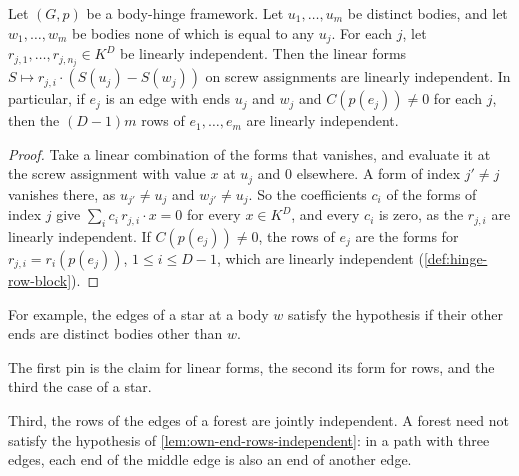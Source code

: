 \begin{lemma}
  \label{lem:own-end-rows-independent}
  \leanok
  Let $(G,p)$ be a body-hinge framework. Let $u_1, \dots, u_m$ be
  distinct bodies, and let $w_1, \dots, w_m$ be bodies none of which is
  equal to any $u_j$. For each $j$, let
  $r_{j,1}, \dots, r_{j,n_j} \in K^D$ be linearly independent. Then the
  linear forms $S \mapsto r_{j,i} \cdot (S(u_j) - S(w_j))$ on screw
  assignments are linearly independent. In particular, if $e_j$ is an
  edge with ends $u_j$ and $w_j$ and $C(p(e_j)) \neq 0$ for each $j$,
  then the $(D-1)m$ rows of $e_1, \dots, e_m$ are linearly independent.
\end{lemma}
\begin{proof}
  \leanok
  Take a linear combination of the forms that vanishes, and evaluate it
  at the screw assignment with value $x$ at $u_j$ and $0$ elsewhere. A
  form of index $j' \neq j$ vanishes there, as $u_{j'} \neq u_j$ and
  $w_{j'} \neq u_j$. So the coefficients $c_i$ of the forms of index $j$
  give $\sum_i c_i\, r_{j,i} \cdot x = 0$ for every $x \in K^D$, and
  every $c_i$ is zero, as the $r_{j,i}$ are linearly independent. If
  $C(p(e_j)) \neq 0$, the rows of $e_j$ are the forms for
  $r_{j,i} = r_i(p(e_j))$, $1 \le i \le D - 1$, which are linearly
  independent (\cref{def:hinge-row-block}).
\end{proof}

For example, the edges of a star at a body $w$ satisfy the hypothesis
if their other ends are distinct bodies other than $w$.

\begin{fmlnote}
  The first pin is the claim for linear forms, the second its form for
  rows, and the third the case of a star.
\end{fmlnote}

Third, the rows of the edges of a forest are jointly independent. A
forest need not satisfy the hypothesis of
\cref{lem:own-end-rows-independent}: in a path with three edges, each
end of the middle edge is also an end of another edge.

